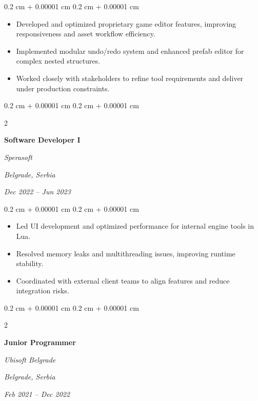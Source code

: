 \documentclass[10pt, letterpaper]{article}
\newenvironment{highlights}{
    \begin{itemize}[
        topsep=0.10 cm,
        parsep=0.10 cm,
        partopsep=0pt,
        itemsep=0pt,
        leftmargin=0.4 cm + 10pt
    ]
}{
    \end{itemize}
} %
\newenvironment{onecolentry}{
    \begin{adjustwidth}{
        0.2 cm + 0.00001 cm
    }{
        0.2 cm + 0.00001 cm
    }
}{
    \end{adjustwidth}
} %
\newenvironment{twocolentry}[2][]{
    \onecolentry
    \def\secondColumn{#2}
    \setcolumnwidth{\fill, 4.5 cm}
    \begin{paracol}{2}
}{
    \switchcolumn \raggedleft \secondColumn
    \end{paracol}
    \endonecolentry
} %
\begin{document}
        \vspace{0.10 cm}
        \begin{onecolentry}
            \begin{highlights}
                \item Developed and optimized proprietary game editor features, improving responsiveness and asset workflow efficiency.
                \item Implemented modular undo/redo system and enhanced prefab editor for complex nested structures.
                \item Worked closely with stakeholders to refine tool requirements and deliver under production constraints.
            \end{highlights}
        \end{onecolentry}


        \vspace{0.3 cm}
        
        \begin{twocolentry}{
        \textit{Belgrade, Serbia}    
            
        \textit{Dec 2022 – Jun 2023}}
            \textbf{Software Developer I}
            
            \textit{Sperasoft}
        \end{twocolentry}

        \vspace{0.10 cm}
        \begin{onecolentry}
            \begin{highlights}
                \item Led UI development and optimized performance for internal engine tools in Lua.
                \item Resolved memory leaks and multithreading issues, improving runtime stability.
                \item Coordinated with external client teams to align features and reduce integration risks.
            \end{highlights}
        \end{onecolentry}


        \vspace{0.3 cm}

        \begin{twocolentry}{
        \textit{Belgrade, Serbia}    
            
        \textit{Feb 2021 –  Dec 2022}}
            \textbf{Junior Programmer}
            
            \textit{Ubisoft Belgrade}
        \end{twocolentry}
\end{document}
